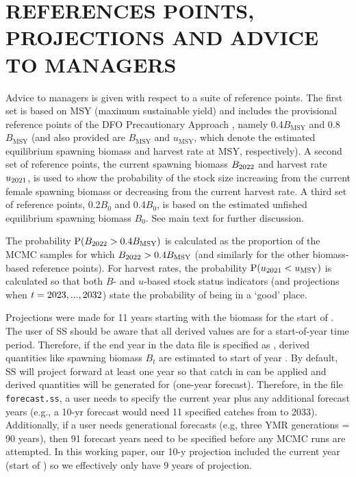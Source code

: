 \documentclass[11pt]{book}
\newcommand{\Bmsy}{B_\mathrm{MSY}}
\newcommand{\umsy}{u_\mathrm{MSY}}
\newcommand{\code}[1]{\normalsize\texttt{#1}\normalsize}%
\begin{document}
\section{REFERENCES POINTS, PROJECTIONS AND ADVICE TO MANAGERS}

Advice to managers is given with respect to a suite of reference points.
The first set is based on MSY (maximum sustainable yield) and includes the provisional reference points of the DFO Precautionary Approach \citep{DFO-SAR:2006_pa, DFO:2009_pa}, namely 0.4$\Bmsy$ and 0.8$\Bmsy$ (and also provided are $\Bmsy$ and $\umsy$, which denote the estimated equilibrium spawning biomass and harvest rate at MSY, respectively). 
A second set of reference points, the current spawning biomass $B_{2022}$ and harvest rate $u_{2021}$, is used to show the probability of the stock size increasing from the current female spawning biomass or decreasing from the current harvest rate.
A third set of reference points, 0.2$B_0$ and 0.4$B_0$, is based on the estimated unfished equilibrium spawning biomass $B_0$.
See main text for further discussion.


The probability $\mathrm{P}(B_{\finalYr} > 0.4\Bmsy)$ is calculated as the proportion of the \Nbase{} MCMC samples for which $B_{\finalYr} > 0.4\Bmsy$ (and similarly for the other biomass-based reference points).
For harvest rates, the probability $\mathrm{P}(u_{\prevYear} < \umsy)$ is calculated so that both $B$- and $u$-based stock status indicators (and projections when $t=2023,...,2032$) state the probability of being in a `good' place.

Projections were made for 11 years starting with the biomass for the start of \currYear.
The user of SS should be aware that all derived values are for a start-of-year time period.
Therefore, if the end year in the data file is specified as \prevYear, derived quantities like spawning biomass $B_t$ are estimated to start of year \prevYear.
By default, SS will project forward at least one year so that catch in \prevYear{} can be applied and derived quantities will be generated for \currYear{} (one-year forecast).
Therefore, in the file \code{forecast.ss}, a user needs to specify the current year plus any additional forecast years (e.g., a 10-yr forecast would need 11 specified catches from \currYear{} to 2033).
Additionally, if a user needs generational forecasts (e.g, three YMR generations = 90 years), then 91 forecast years need to be specified before any MCMC runs are attempted.
In this working paper, our 10-y projection included the current year (start of \currYear) so we effectively only have 9 years of projection.
\end{document}
